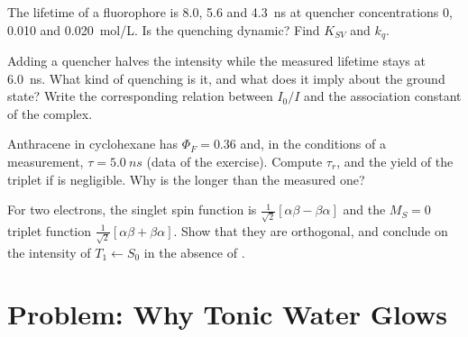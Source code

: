 \begin{exercise}[$\star\star$]\label{exo:b3:electronic-spectroscopy:9}
The lifetime of a fluorophore is 8.0, 5.6 and \qty{4.3}{ns} at quencher
concentrations 0, 0.010 and \qty{0.020}{mol/L}. Is the quenching dynamic? Find
$K_{SV}$ and $k_q$.
\end{exercise}

\begin{exercise}[$\star\star\star$]\label{exo:b3:electronic-spectroscopy:10}
Adding a quencher halves the  intensity while the measured
lifetime stays at \qty{6.0}{ns}. What kind of quenching is it, and what does it
imply about the ground state? Write the corresponding relation between $I_0/I$
and the association constant of the complex.
\end{exercise}

\begin{exercise}[$\star\star\star$]\label{exo:b3:electronic-spectroscopy:11}
Anthracene in cyclohexane has $\Phi_F = 0.36$ and, in the conditions of a
measurement, $\tau = \qty{5.0}{ns}$ (data of the exercise). Compute $\tau_r$, and the
yield of the triplet if  is negligible. Why is the
 longer than the measured one?
\end{exercise}

\begin{exercise}[$\star\star\star$]\label{exo:b3:electronic-spectroscopy:12}
For two electrons, the singlet spin function is $\frac{1}{\sqrt2}[\alpha\beta - \beta\alpha]$
and the $M_S = 0$ triplet function $\frac{1}{\sqrt2}[\alpha\beta + \beta\alpha]$. Show that
they are orthogonal, and conclude on the intensity of $T_1 \leftarrow S_0$ in the
absence of .
\end{exercise}

\section{Problem: Why Tonic Water Glows}


